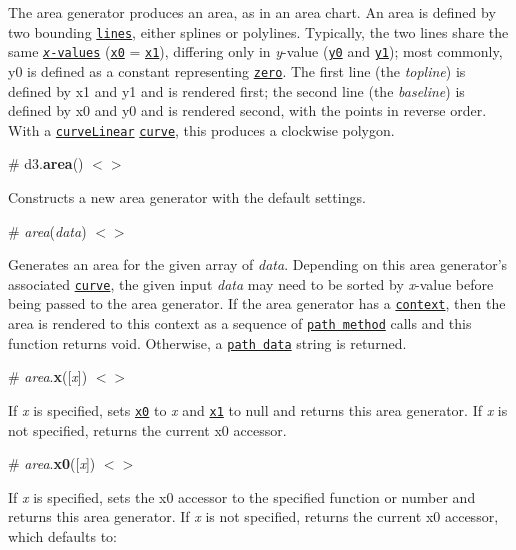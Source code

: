 The area generator produces an area, as in an area chart. An area is defined by two bounding \href{#lines}{\tt lines}, either splines or polylines. Typically, the two lines share the same \href{#area_x}{\tt {\itshape x}-\/values} (\href{#area_x0}{\tt x0} = \href{#area_x1}{\tt x1}), differing only in {\itshape y}-\/value (\href{#area_y0}{\tt y0} and \href{#area_y1}{\tt y1}); most commonly, y0 is defined as a constant representing \href{http://www.vox.com/2015/11/19/9758062/y-axis-zero-chart}{\tt zero}. The first line (the {\itshape topline}) is defined by x1 and y1 and is rendered first; the second line (the {\itshape baseline}) is defined by x0 and y0 and is rendered second, with the points in reverse order. With a \href{#curveLinear}{\tt curve\+Linear} \href{#area_curve}{\tt curve}, this produces a clockwise polygon.

\label{_area}%
\# d3.{\bfseries area}() \href{https://github.com/d3/d3-shape/blob/master/src/area.js}{\tt $<$$>$}

Constructs a new area generator with the default settings.

\label{__area}%
\# {\itshape area}({\itshape data}) \href{https://github.com/d3/d3-shape/blob/master/src/area.js#L17}{\tt $<$$>$}

Generates an area for the given array of {\itshape data}. Depending on this area generator’s associated \href{#area_curve}{\tt curve}, the given input {\itshape data} may need to be sorted by {\itshape x}-\/value before being passed to the area generator. If the area generator has a \href{#line_context}{\tt context}, then the area is rendered to this context as a sequence of \href{http://www.w3.org/TR/2dcontext/#canvaspathmethods}{\tt path method} calls and this function returns void. Otherwise, a \href{http://www.w3.org/TR/SVG/paths.html#PathData}{\tt path data} string is returned.

\label{_area_x}%
\# {\itshape area}.{\bfseries x}(\mbox{[}{\itshape x}\mbox{]}) \href{https://github.com/d3/d3-shape/blob/master/src/area.js#L59}{\tt $<$$>$}

If {\itshape x} is specified, sets \href{#area_x0}{\tt x0} to {\itshape x} and \href{#area_x1}{\tt x1} to null and returns this area generator. If {\itshape x} is not specified, returns the current x0 accessor.

\label{_area_x0}%
\# {\itshape area}.{\bfseries x0}(\mbox{[}{\itshape x}\mbox{]}) \href{https://github.com/d3/d3-shape/blob/master/src/area.js#L63}{\tt $<$$>$}

If {\itshape x} is specified, sets the x0 accessor to the specified function or number and returns this area generator. If {\itshape x} is not specified, returns the current x0 accessor, which defaults to\+:


